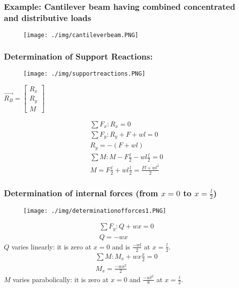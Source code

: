 \subsubsection{Example: Cantilever beam having combined concentrated and distributive loads}
\begin{figure}[H]
  \centering
  \texttt{[image: ./img/cantileverbeam.PNG]}
\end{figure}
\subsubsection{Determination of Support Reactions:}
\begin{figure}[H]
  \centering
  \texttt{[image: ./img/supportreactions.PNG]}
\end{figure}
\begin{center}
  $\vec{R_B} = \left[ \begin{array}{ccc} R_x \\ R_y \\ M \end{array}\right]$
\end{center}
\begin{gather}
  \sum F_x: R_x = 0 \\
  \sum F_y: R_y + F + wl = 0 \\
  R_y = -(F+wl) \\
  \sum M: M - F\frac{l}{2} - wl\frac{l}{2} = 0 \\
  M = F\frac{l}{2} + wl\frac{l}{2} = \frac{Fl+wl^2}{2}
\end{gather}
\subsubsection{Determination of internal forces (from $x=0$ to $x=\frac{l}{2}$)}
\begin{figure}[H]
  \centering
  \texttt{[image: ./img/determinationofforces1.PNG]}
\end{figure}
\begin{gather}
  \sum F_y: Q + wx = 0 \\
  Q = -wx
\end{gather}
$Q$ varies linearly: it is zero at $x=0$ and is $\frac{-wl}{2}$ at $x=\frac{l}{2}$.
\begin{gather}
  \sum M: M_x + wx\frac{x}{2} = 0 \\
  M_x = \frac{-wx^2}{2}
\end{gather}
$M$ varies parabolically: it is zero at $x=0$ and $\frac{-wl^2}{8}$ at $x=\frac{l}{2}$.
